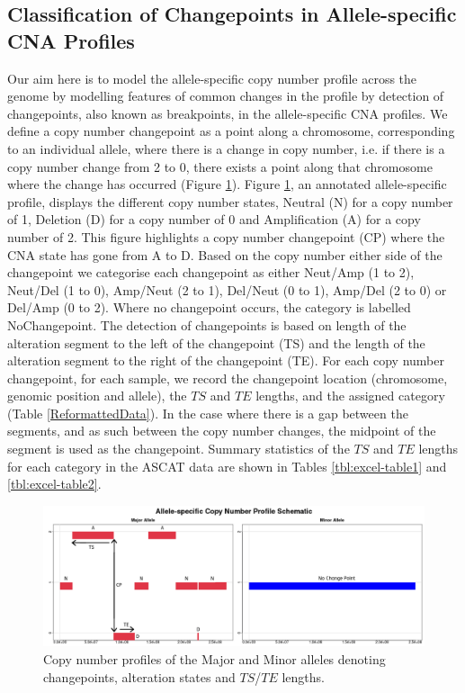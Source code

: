 \subsection{Classification of Changepoints in Allele-specific CNA Profiles}
Our aim here is to model the allele-specific copy number profile across the genome by modelling features of common changes in the profile by detection of changepoints, also known as breakpoints, in the allele-specific CNA profiles. We define a copy number changepoint as a point along a chromosome, corresponding to an individual allele, where there is a change in copy number, i.e. if there is a copy number change from 2 to 0, there exists a point along that chromosome where the change has occurred (Figure \ref{fig:MockASCAT_1}). Figure \ref{fig:MockASCAT_1}, an annotated allele-specific profile, displays the different copy number states, Neutral (N) for a copy number of 1, Deletion (D) for a copy number of 0 and Amplification (A) for a copy number of 2. This figure highlights a copy number changepoint (CP) where the CNA state has gone from A to D. Based on the copy number either side of the changepoint we categorise each changepoint as either Neut/Amp (1 to 2), Neut/Del (1 to 0), Amp/Neut (2 to 1), Del/Neut (0 to 1), Amp/Del (2 to 0) or Del/Amp (0 to 2). Where no changepoint occurs, the category is labelled NoChangepoint. The detection of changepoints is based on length of the alteration segment to the left of the changepoint (TS) and the length of the alteration segment to the right of the changepoint (TE). For each copy number changepoint, for each sample, we record the changepoint location (chromosome, genomic position and allele), the $TS$ and $TE$ lengths, and the assigned category (Table \ref{ReformattedData}). In the case where there is a gap between the segments, and as such between the copy number changes, the midpoint of the segment is used as the changepoint. Summary statistics of the $TS$ and $TE$ lengths for each category in the ASCAT data are shown in Tables \ref{tbl:excel-table1} and \ref{tbl:excel-table2}. 

\begin{figure}[!ht]
\center
\includegraphics[width = 1\textwidth]{../figures/Chapter_5/Annotated_ASCAT_Profile.png}
\caption[Copy number profiles of the Major and Minor alleles denoting changepoints, alteration states and $TS$/$TE$ lengths.]{Copy number profiles of the Major and Minor alleles denoting changepoints, alteration states and $TS$/$TE$ lengths.}
\label{fig:MockASCAT_1}
\end{figure}

